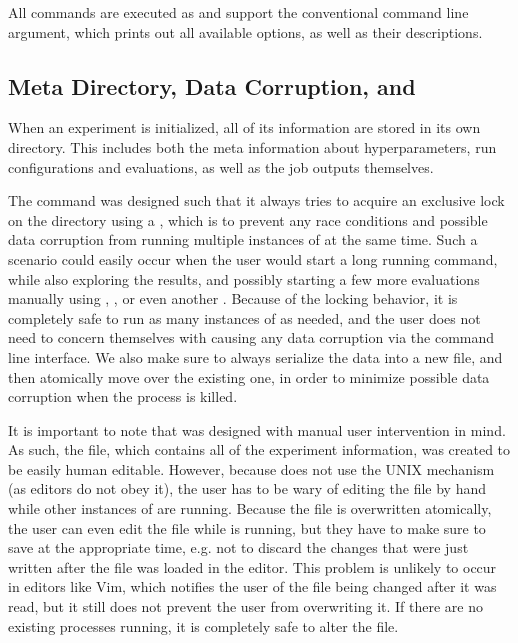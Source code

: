 All commands are executed as  and support the conventional  command line argument, which prints out all available options, as well as their descriptions.

\subsection{Meta Directory, Data Corruption, and }
\label{section:meta-dir}

When an experiment is initialized, all of its information are stored in its own directory. This includes both the meta information about hyperparameters, run configurations and evaluations, as well as the job outputs themselves.

The \bopt command was designed such that it always tries to acquire an exclusive lock on the directory using a , which is to prevent any race conditions and possible data corruption from running multiple instances of \bopt at the same time. Such a scenario could easily occur when the user would start a long running  command, while also exploring the results, and possibly starting a few more evaluations manually using , , or even another . Because of the locking behavior, it is completely safe to run as many instances of \bopt as needed, and the user does not need to concern themselves with causing any data corruption via the command line interface. We also make sure to always serialize the data into a new file, and then atomically move over the existing one, in order to minimize possible data corruption when the \bopt process is killed.

It is important to note that \bopt was designed with manual user intervention in mind. As such, the  file, which contains all of the experiment information, was created to be easily human editable. However, because \bopt does not use the UNIX  mechanism (as editors do not obey it), the user has to be wary of editing the file by hand while other instances of \bopt are running. Because the  file is overwritten atomically, the user can even edit the file while \bopt is running, but they have to make sure to save at the appropriate time, e.g. not to discard the changes that were just written after the file was loaded in the editor. This problem is unlikely to occur in editors like Vim, which notifies the user of the file being changed after it was read, but it still does not prevent the user from overwriting it. If there are no existing \bopt processes running, it is completely safe to alter the  file.

